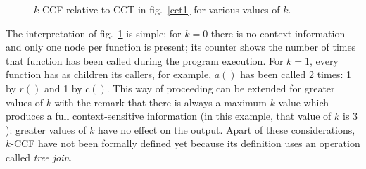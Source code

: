 \documentclass[a4paper,10pt]{report}
\begin{document}
\begin{figure}[H]

\begin{center}
\end{center}

\caption{$k$-CCF relative to CCT in fig.~\ref{cct1} for various values of $k$.}
\label{kccf1}

\end{figure}

The interpretation of fig.~\ref{kccf1} is simple: for $k=0$ there is no context
information and only one node per function is present; its counter shows the number of times that function has been called during the program execution. For $k=1$, every function has as children its callers, for example, $a()$ has been called $2$ times: 1 by $r()$ and 1 by $c()$. This way of proceeding can be extended for greater values of $k$ with the remark that 
there is always a maximum $k$-value which produces a full context-sensitive information 
(in this example, that value of $k$ is $3$): greater values of $k$ have no effect on the output. Apart of these considerations, $k$-CCF have not been formally defined yet because its definition uses an operation called \emph{tree join}.
\end{document}
